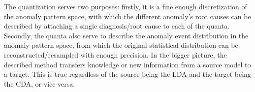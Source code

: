 			The quantization serves two purposes: firstly, it is a fine enough discretization of the anomaly pattern space, with which the different anomaly’s root causes can be described by attaching a single diagnosis/root cause to each of the quanta.
			Secondly, the quanta also serve to describe the anomaly event distribution in the anomaly pattern space, from which the original statistical distribution can be reconstructed/resampled with enough precision.			
			In the bigger picture, the described method transfers knowledge or new information from a source model to a target.
			This is true regardless of the source being the \ac{LDA} and the target being the \ac{CDA}, or vice-versa.
		
%			
%			
%			
%			
